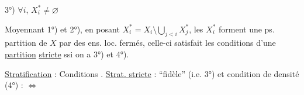 3°) $\forall i$, $X_i^*\ne\varnothing$


Moyennant 1°) et 2°), en posant $X_i^*=X_i\setminus\bigcup_{j<i}X_j^*$,
les $X_i^*$ forment une ps. partition  de $X$ par des
ens. loc. fermés, celle-ci satisfait les conditions
d'une \uline{partition} \uline{} \uline{stricte}  ssi
on a 3°) et 4°).

\uline{Stratification} : Conditions . \uline{Strat. stricte} : ``fidèle'' (i.e.
3°) et condition de densité (4°) :  $\Longleftrightarrow$ 

